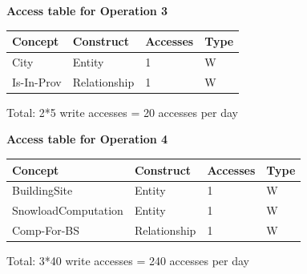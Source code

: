 \documentclass{article}[h]
\begin{document}
{\pagebreak

{\centering \textbf{Access table for Operation 3}\\}
\begin{table}[H]
  \def\arraystretch{1.10}%
  \centering
  \begin{tabular}{ | m{4cm} | m{4cm}| m{3cm} | m{2cm} |} 
    \hline
    {\textbf{\large Concept}} & {\textbf{\large Construct}} & {\textbf{\large Accesses}} & {\textbf{\large Type}} \\
    \hline
    \color[HTML]{3531FF} City & Entity & 1 & W \\ 
    \hline
    \color[HTML]{3531FF} Is-In-Prov & Relationship & 1 & W \\ 
    \hline
  \end{tabular}
\end{table}
Total: 2*5 write accesses = 20 accesses per day

\vspace{12px}

{\centering \textbf{Access table for Operation 4}\\}
\begin{table}[H]
  \def\arraystretch{1.10}%
  \centering
  \begin{tabular}{ | m{4cm} | m{4cm}| m{3cm} | m{2cm} |} 
    \hline
    {\textbf{\large Concept}} & {\textbf{\large Construct}} & {\textbf{\large Accesses}} & {\textbf{\large Type}} \\
    \hline
    \color[HTML]{3531FF} BuildingSite & Entity & 1 & W \\ 
    \hline
    \color[HTML]{3531FF} SnowloadComputation & Entity & 1 & W \\ 
    \hline
    \color[HTML]{3531FF} Comp-For-BS & Relationship & 1 & W \\ 
    \hline
  \end{tabular}
\end{table}
Total: 3*40 write accesses = 240 accesses per day

\vspace{12px}

}
\end{document}
